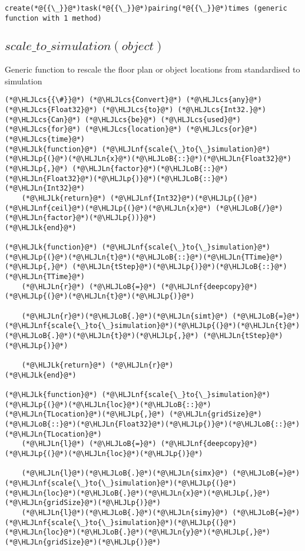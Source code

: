 \documentclass[12pt,a4paper]{article}
\newcommand{\HLJLk}[1]{\textcolor[RGB]{148,91,176}{\textbf{#1}}}
\newcommand{\HLJLn}[1]{#1}
\newcommand{\HLJLnf}[1]{\textcolor[RGB]{66,102,213}{#1}}
\newcommand{\HLJLoB}[1]{\textcolor[RGB]{102,102,102}{\textbf{#1}}}
\newcommand{\HLJLp}[1]{#1}
\newcommand{\HLJLcs}[1]{\textcolor[RGB]{153,153,119}{\textit{#1}}}
\begin{document}
\begin{lstlisting}
create(*@{{\_}}@*)task(*@{{\_}}@*)pairing(*@{{\_}}@*)times (generic function with 1 method)
\end{lstlisting}


\subsection{$scale\_to\_simulation(object)$}
Generic function to rescale the floor plan or object locations from standardised to simulation


\begin{lstlisting}
(*@\HLJLcs{{\#}}@*) (*@\HLJLcs{Convert}@*) (*@\HLJLcs{any}@*) (*@\HLJLcs{Float32}@*) (*@\HLJLcs{to}@*) (*@\HLJLcs{Int32.}@*) (*@\HLJLcs{Can}@*) (*@\HLJLcs{be}@*) (*@\HLJLcs{used}@*) (*@\HLJLcs{for}@*) (*@\HLJLcs{location}@*) (*@\HLJLcs{or}@*) (*@\HLJLcs{time}@*)
(*@\HLJLk{function}@*) (*@\HLJLnf{scale{\_}to{\_}simulation}@*)(*@\HLJLp{(}@*)(*@\HLJLn{x}@*)(*@\HLJLoB{::}@*)(*@\HLJLn{Float32}@*)(*@\HLJLp{,}@*) (*@\HLJLn{factor}@*)(*@\HLJLoB{::}@*)(*@\HLJLn{Float32}@*)(*@\HLJLp{)}@*)(*@\HLJLoB{::}@*)(*@\HLJLn{Int32}@*)
    (*@\HLJLk{return}@*) (*@\HLJLnf{Int32}@*)(*@\HLJLp{(}@*)(*@\HLJLnf{ceil}@*)(*@\HLJLp{(}@*)(*@\HLJLn{x}@*) (*@\HLJLoB{/}@*) (*@\HLJLn{factor}@*)(*@\HLJLp{))}@*)
(*@\HLJLk{end}@*)

(*@\HLJLk{function}@*) (*@\HLJLnf{scale{\_}to{\_}simulation}@*)(*@\HLJLp{(}@*)(*@\HLJLn{t}@*)(*@\HLJLoB{::}@*)(*@\HLJLn{TTime}@*)(*@\HLJLp{,}@*) (*@\HLJLn{tStep}@*)(*@\HLJLp{)}@*)(*@\HLJLoB{::}@*)(*@\HLJLn{TTime}@*)
    (*@\HLJLn{r}@*) (*@\HLJLoB{=}@*) (*@\HLJLnf{deepcopy}@*)(*@\HLJLp{(}@*)(*@\HLJLn{t}@*)(*@\HLJLp{)}@*)

    (*@\HLJLn{r}@*)(*@\HLJLoB{.}@*)(*@\HLJLn{simt}@*) (*@\HLJLoB{=}@*) (*@\HLJLnf{scale{\_}to{\_}simulation}@*)(*@\HLJLp{(}@*)(*@\HLJLn{t}@*)(*@\HLJLoB{.}@*)(*@\HLJLn{t}@*)(*@\HLJLp{,}@*) (*@\HLJLn{tStep}@*)(*@\HLJLp{)}@*)

    (*@\HLJLk{return}@*) (*@\HLJLn{r}@*)
(*@\HLJLk{end}@*)

(*@\HLJLk{function}@*) (*@\HLJLnf{scale{\_}to{\_}simulation}@*)(*@\HLJLp{(}@*)(*@\HLJLn{loc}@*)(*@\HLJLoB{::}@*)(*@\HLJLn{TLocation}@*)(*@\HLJLp{,}@*) (*@\HLJLn{gridSize}@*)(*@\HLJLoB{::}@*)(*@\HLJLn{Float32}@*)(*@\HLJLp{)}@*)(*@\HLJLoB{::}@*)(*@\HLJLn{TLocation}@*)
    (*@\HLJLn{l}@*) (*@\HLJLoB{=}@*) (*@\HLJLnf{deepcopy}@*)(*@\HLJLp{(}@*)(*@\HLJLn{loc}@*)(*@\HLJLp{)}@*)

    (*@\HLJLn{l}@*)(*@\HLJLoB{.}@*)(*@\HLJLn{simx}@*) (*@\HLJLoB{=}@*) (*@\HLJLnf{scale{\_}to{\_}simulation}@*)(*@\HLJLp{(}@*)(*@\HLJLn{loc}@*)(*@\HLJLoB{.}@*)(*@\HLJLn{x}@*)(*@\HLJLp{,}@*) (*@\HLJLn{gridSize}@*)(*@\HLJLp{)}@*)
    (*@\HLJLn{l}@*)(*@\HLJLoB{.}@*)(*@\HLJLn{simy}@*) (*@\HLJLoB{=}@*) (*@\HLJLnf{scale{\_}to{\_}simulation}@*)(*@\HLJLp{(}@*)(*@\HLJLn{loc}@*)(*@\HLJLoB{.}@*)(*@\HLJLn{y}@*)(*@\HLJLp{,}@*) (*@\HLJLn{gridSize}@*)(*@\HLJLp{)}@*)


\end{lstlisting}
\end{document}
